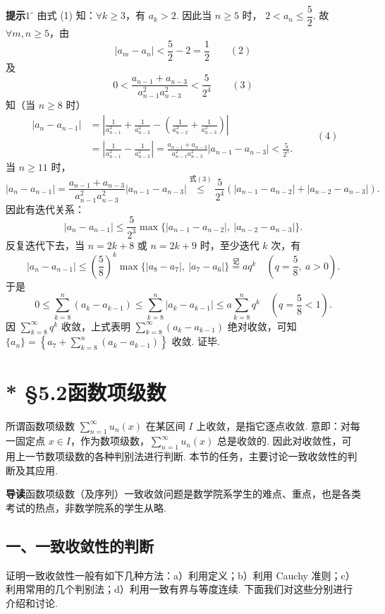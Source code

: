 \documentclass[UTF8,12pt,a4paper,fontset=fandol]{ctexart}
\begin{document}
\noindent\textbf{提示}\quad $1^\circ$ 由式 (1) 知：$\forall k\ge3$，有 $a_k>2$. 因此当 $n\ge5$ 时，
$2<a_n\le\dfrac52$. 故 $\forall m,n\ge5$，由
\[
  |a_m-a_n|<\frac52-2=\frac12
\qquad(2)
\]
及
\[
  0<\frac{a_{n-1}+a_{n-3}}{a_{n-1}^2a_{n-3}^2}<\frac5{2^4}
\qquad(3)
\]
知（当 $n\ge8$ 时）
\begin{equation}
\begin{aligned}
|a_n-a_{n-1}|
&=\left|\frac1{a_{n-1}^2}+\frac1{a_{n-2}^2}
 -\left(\frac1{a_{n-2}^2}+\frac1{a_{n-3}^2}\right)\right|\\
&=\left|\frac1{a_{n-1}^2}-\frac1{a_{n-3}^2}\right|
=\frac{a_{n-1}+a_{n-3}}{a_{n-1}^2a_{n-3}^2}|a_{n-1}-a_{n-3}|
<\frac5{2^5}.
\end{aligned}
\qquad(4)
\end{equation}
当 $n\ge11$ 时，
\[
  |a_n-a_{n-1}|=\frac{a_{n-1}+a_{n-3}}{a_{n-1}^2a_{n-3}^2}|a_{n-1}-a_{n-3}|
  \stackrel{\text{式}(3)}{\le}\frac5{2^4}\left(|a_{n-1}-a_{n-2}|+|a_{n-2}-a_{n-3}|\right).
\]
因此有迭代关系：
\[
  |a_n-a_{n-1}|\le\frac5{2^3}\max\{|a_{n-1}-a_{n-2}|,\ |a_{n-2}-a_{n-3}|\}.
\]
反复迭代下去，当 $n=2k+8$ 或 $n=2k+9$ 时，至少迭代 $k$ 次，有
\[
  |a_n-a_{n-1}|\le\left(\frac58\right)^k
  \max\{|a_8-a_7|,\ |a_7-a_6|\}\stackrel{\text{记}}{=}aq^k
  \quad\left(q=\frac58,\ a>0\right).
\]
于是
\[
  0\le\sum_{k=8}^n(a_k-a_{k-1})
  \le\sum_{k=8}^n|a_k-a_{k-1}|
  \le a\sum_{k=8}^nq^k\quad\left(q=\frac58<1\right).
\]
因 $\sum_{k=8}^{\infty}q^k$ 收敛，上式表明
$\sum_{k=8}^{\infty}(a_k-a_{k-1})$ 绝对收敛，可知
$\{a_n\}=\left\{a_7+\sum_{k=8}^n(a_k-a_{k-1})\right\}$ 收敛. 证毕.

\section*{* §5.2\quad 函数项级数}

所谓函数项级数 $\displaystyle\sum_{n=1}^{\infty}u_n(x)$ 在某区间 $I$ 上收敛，是指它逐点收敛. 意即：对每一固定点
$x\in I$，作为数项级数，$\displaystyle\sum_{n=1}^{\infty}u_n(x)$ 总是收敛的. 因此对收敛性，可用上一节数项级数的各种判别法进行判断. 本节的任务，主要讨论一致收敛性的判断及其应用.

\noindent\textbf{导读}\quad 函数项级数（及序列）一致收敛问题是数学院系学生的难点、重点，也是各类考试的热点，非数学院系的学生从略.

\subsection*{一、一致收敛性的判断}

证明一致收敛性一般有如下几种方法：a）利用定义；b）利用 Cauchy 准则；c）利用常用的几个判别法；d）利用一致有界与等度连续. 下面我们对这些分别进行介绍和讨论.
\end{document}
